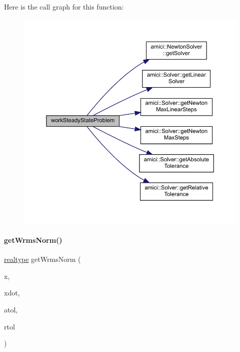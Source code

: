 Here is the call graph for this function\+:
\nopagebreak
\begin{figure}[H]
\begin{center}
\leavevmode
\includegraphics[width=350pt]{classamici_1_1_steadystate_problem_aa2630b3401b8f0a50bf50c73d4f39790_cgraph}
\end{center}
\end{figure}
\mbox{\label{classamici_1_1_steadystate_problem_afd3dce48510d1fce72b18049b40fff5a}} 
\paragraph{\texorpdfstring{get\+Wrms\+Norm()}{getWrmsNorm()}}
{\footnotesize\ttfamily \mbox{\hyperlink{namespaceamici_a1bdce28051d6a53868f7ccbf5f2c14a3}{realtype}} get\+Wrms\+Norm (\begin{DoxyParamCaption}\item[{\mbox{\hyperlink{classamici_1_1_ami_vector}{Ami\+Vector}} const \&}]{x,  }\item[{\mbox{\hyperlink{classamici_1_1_ami_vector}{Ami\+Vector}} const \&}]{xdot,  }\item[{\mbox{\hyperlink{namespaceamici_a1bdce28051d6a53868f7ccbf5f2c14a3}{realtype}}}]{atol,  }\item[{\mbox{\hyperlink{namespaceamici_a1bdce28051d6a53868f7ccbf5f2c14a3}{realtype}}}]{rtol }\end{DoxyParamCaption})}


